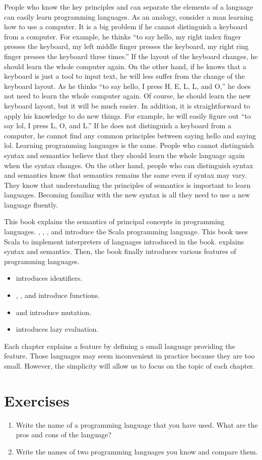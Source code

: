 People who know the key principles and can separate the elements of a language
can easily learn programming languages. As an analogy, consider a man learning
how to use a computer. It is a big problem if he cannot distinguish a keyboard
from a computer. For example, he thinks ``to say hello, my right index finger
presses the keyboard, my left middle finger presses the keyboard, my right ring
finger presses the keyboard three times.'' If the layout of the keyboard changes,
he should learn the whole computer again. On the other hand, if he knows that a
keyboard is just a tool to input text, he will less suffer from the change of
the keyboard layout. As he thinks ``to say hello, I press H, E, L, L, and O,'' he
does not need to learn the whole computer again. Of course, he should learn the
new keyboard layout, but it will be much easier. In addition, it is
straightforward to apply his knowledge to do new things. For example, he will
easily figure out ``to say lol, I press L, O, and L.'' If he does not distinguish
a keyboard from a computer, he cannot find any common principles between saying
hello and saying lol. Learning programming languages is the same. People who
cannot distinguish syntax and semantics believe that they should learn the whole
language again when the syntax changes. On the other hand, people who can
distinguish syntax and semantics know that semantics remains the same even if
syntax may vary. They know that understanding the principles of semantics is
important to learn languages. Becoming familiar with the
new syntax is all they need to use a new language fluently.

This book explains the semantics of principal concepts in programming languages.
, ,
, and 
introduce the Scala programming language. This book
uses Scala to implement interpreters of languages introduced in the book.
 explains syntax and
semantics. Then, the book finally introduces various features of programming languages.
\begin{itemize}
    \item {} introduces identifiers.
    \item {}, , and 
      introduce functions.
    \item {} and  introduce mutation.
    \item {} introduces lazy evaluation.
\end{itemize}
Each chapter explains a feature by defining a small language providing the
feature. Those languages may seem inconvenient in practice because they are too small.
However, the simplicity will allow us to focus on the topic of each chapter.

\section{Exercises}

\begin{enumerate}
\item Write the name of a programming language that you have used.
  What are the pros and cons of the language?
\item Write the names of two programming languages you know and compare them.
\end{enumerate}
